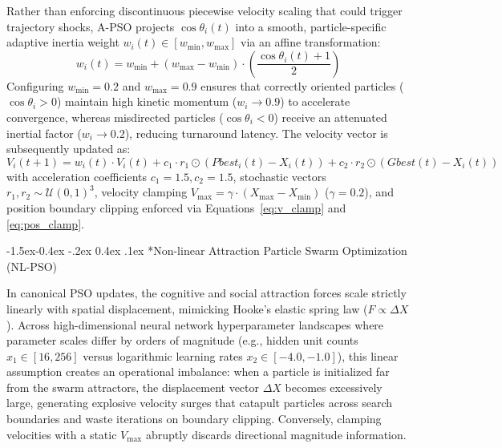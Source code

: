 \documentclass[10pt]{article}
\makeatletter
\renewcommand\subsubsection{\@startsection{subsubsection}{3}{\z@}%
                                     {-1.5ex\@plus -0.4ex \@minus -.2ex}%
                                     {0.4ex \@plus .1ex}%
                                     {\normalfont\itshape\fontsize{7.8pt}{10.0pt}\selectfont}}
\makeatother
\begin{document}
Rather than enforcing discontinuous piecewise velocity scaling that could trigger trajectory shocks, A-PSO projects $\cos\theta_i(t)$ into a smooth, particle-specific adaptive inertia weight $w_i(t) \in [w_{\min}, w_{\max}]$ via an affine transformation:
\begin{equation}
w_i(t) = w_{\min} + (w_{\max} - w_{\min}) \cdot \left( \frac{\cos\theta_i(t) + 1}{2} \right) \label{eq:apso_adaptive_w}
\end{equation}
Configuring $w_{\min} = 0.2$ and $w_{\max} = 0.9$ ensures that correctly oriented particles ($\cos\theta_i > 0$) maintain high kinetic momentum ($w_i \to 0.9$) to accelerate convergence, whereas misdirected particles ($\cos\theta_i < 0$) receive an attenuated inertial factor ($w_i \to 0.2$), reducing turnaround latency. The velocity vector is subsequently updated as:
\begin{equation}
V_i(t+1) = w_i(t) \cdot V_i(t) + c_1 \cdot r_1 \odot (Pbest_i(t) - X_i(t)) + c_2 \cdot r_2 \odot (Gbest(t) - X_i(t)) \label{eq:apso_velocity}
\end{equation}
with acceleration coefficients $c_1 = 1.5, c_2 = 1.5$, stochastic vectors $r_1, r_2 \sim \mathcal{U}(0,1)^3$, velocity clamping $V_{\max} = \gamma \cdot (X_{\max} - X_{\min})$ ($\gamma = 0.2$), and position boundary clipping enforced via Equations~\eqref{eq:v_clamp} and \eqref{eq:pos_clamp}.


\subsubsection*{Non-linear Attraction Particle Swarm Optimization (NL-PSO)}

In canonical PSO updates, the cognitive and social attraction forces scale strictly linearly with spatial displacement, mimicking Hooke's elastic spring law ($F \propto \Delta X$). Across high-dimensional neural network hyperparameter landscapes where parameter scales differ by orders of magnitude (e.g., hidden unit counts $x_1 \in [16, 256]$ versus logarithmic learning rates $x_2 \in [-4.0, -1.0]$), this linear assumption creates an operational imbalance: when a particle is initialized far from the swarm attractors, the displacement vector $\Delta X$ becomes excessively large, generating explosive velocity surges that catapult particles across search boundaries and waste iterations on boundary clipping. Conversely, clamping velocities with a static $V_{\max}$ abruptly discards directional magnitude information.
\end{document}
